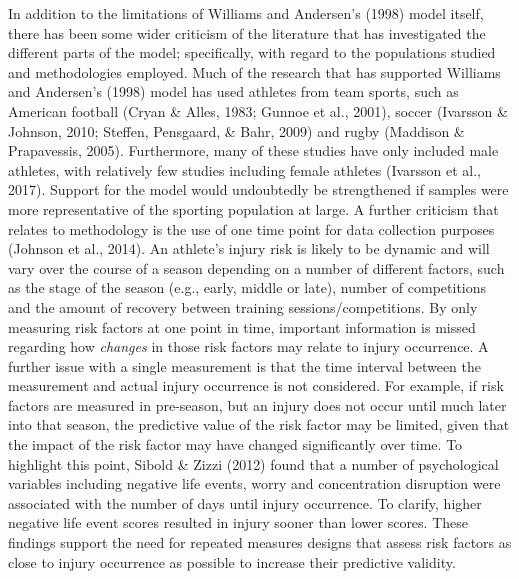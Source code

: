 \documentclass[
  english,
  man,floatsintext]{apa6}
\begin{document}
In addition to the limitations of Williams and Andersen's (1998) model itself, there has been some wider criticism of the literature that has investigated the different parts of the model; specifically, with regard to the populations studied and methodologies employed.
Much of the research that has supported Williams and Andersen's (1998) model has used athletes from team sports, such as American football (Cryan \& Alles, 1983; Gunnoe et al., 2001), soccer (Ivarsson \& Johnson, 2010; Steffen, Pensgaard, \& Bahr, 2009) and rugby (Maddison \& Prapavessis, 2005).
Furthermore, many of these studies have only included male athletes, with relatively few studies including female athletes (Ivarsson et al., 2017).
Support for the model would undoubtedly be strengthened if samples were more representative of the sporting population at large.
A further criticism that relates to methodology is the use of one time point for data collection purposes (Johnson et al., 2014).
An athlete's injury risk is likely to be dynamic and will vary over the course of a season depending on a number of different factors, such as the stage of the season (e.g., early, middle or late), number of competitions and the amount of recovery between training sessions/competitions.
By only measuring risk factors at one point in time, important information is missed regarding how \emph{changes} in those risk factors may relate to injury occurrence.
A further issue with a single measurement is that the time interval between the measurement and actual injury occurrence is not considered.
For example, if risk factors are measured in pre-season, but an injury does not occur until much later into that season, the predictive value of the risk factor may be limited, given that the impact of the risk factor may have changed significantly over time.
To highlight this point, Sibold \& Zizzi (2012) found that a number of psychological variables including negative life events, worry and concentration disruption were associated with the number of days until injury occurrence.
To clarify, higher negative life event scores resulted in injury sooner than lower scores.
These findings support the need for repeated measures designs that assess risk factors as close to injury occurrence as possible to increase their predictive validity.
\end{document}
